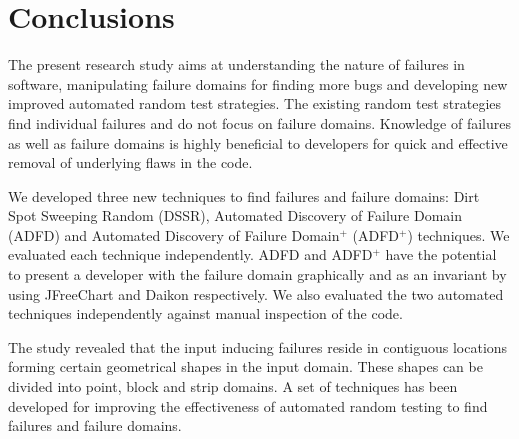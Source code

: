 
\chapter{Conclusions}
\label{chap:conclusions_8}



The present research study aims at understanding the nature of failures in software, manipulating failure domains for finding more bugs and developing new improved automated random test strategies. The existing random test strategies find individual failures and do not focus on failure domains. Knowledge of failures as well as failure domains is highly beneficial to developers for quick and effective removal of underlying flaws in the code.


We developed three new techniques to find failures and failure domains: Dirt Spot Sweeping Random (DSSR), Automated Discovery of Failure Domain (ADFD) and Automated Discovery of Failure Domain$^+$ (ADFD$^+$) techniques. We evaluated each technique independently. ADFD and ADFD$^+$ have the potential to present a developer with the failure domain graphically and as an invariant by using JFreeChart and Daikon respectively. We also evaluated the two automated techniques independently against manual inspection of the code.

 
The study revealed that the input inducing failures reside in contiguous locations forming certain geometrical shapes in the input domain. These shapes can be divided into point, block and strip domains. A set of techniques has been developed for improving the effectiveness of automated random testing to find failures and failure domains. 


